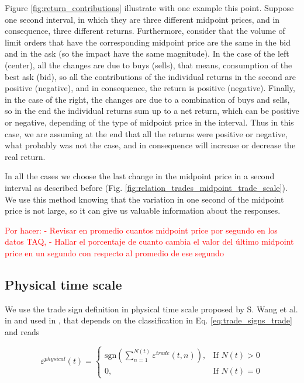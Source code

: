 Figure \ref{fig:return_contributions} illustrate with one example this point.
Suppose one second interval, in which they are three different midpoint prices,
and in consequence, three different returns. Furthermore, consider that the
volume of limit orders that have the corresponding midpoint price are the same
in the bid and in the ask (so the impact have the same magnitude). In the case
of the left (center), all the changes are due to buys (sells), that means,
consumption of the best ask (bid), so all the contributions of the individual
returns in the second are positive (negative), and in consequence, the return
is positive (negative). Finally, in the case of the right, the changes are due
to a combination of buys and sells, so in the end the individual returns sum up
to a net return, which can be positive or negative, depending of the type of
midpoint price in the interval. Thus in this case, we are assuming at the end
that all the returns were positive or negative, what probably was not the case,
and in consequence will increase or decrease the real return.

In all the cases we choose the last change in the midpoint price in a second
interval as described before
(Fig. \ref{fig:relation_trades_midpoint_trade_scale}). We use this method
knowing that the variation in one second of the midpoint price is not large, so
it can give us valuable information about the responses.

\textcolor{red}{Por hacer: - Revisar en promedio cuantos midpoint price por
                segundo en los datos TAQ, - Hallar el porcentaje de cuanto
                cambia el valor del último midpoint price en un segundo con
                respecto al promedio de ese segundo}

\subsection{Physical time scale}\label{subsec:physical_time}

We use the trade sign definition in physical time scale proposed by
S. Wang et al. in \cite{Wang_2016_cross} and used in
\cite{Wang_2016_avg,Wang_2017}, that depends on the classification in
Eq. \ref{eq:trade_signs_trade} and reads

\begin{equation}\label{eq:trade_signs_physical}
    \varepsilon^{physical}\left(t\right)=\left\{
    \begin{array}{cc}
    \text{sgn}\left(\sum_{n=1}^{N\left(t\right)}\varepsilon^{trade}
    \left(t,n\right)\right),
    & \text{If }N \left(t\right)>0\\
    0, & \text{If }N\left(t\right)=0
    \end{array}\right.
\end{equation}

